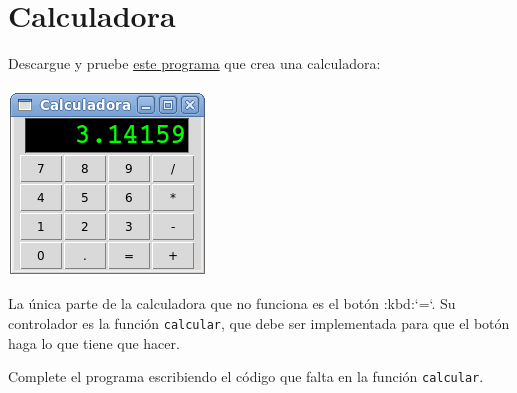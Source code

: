 \section{Calculadora}

Descargue y pruebe
\href{../../\_static/programas/tkinter/calculadora.py}{este programa}
que crea una calculadora:

\includegraphics{../../_static/capturas/calc.png}

La única parte de la calculadora que no funciona es el botón :kbd:`=`.
Su controlador es la función \lstinline!calcular!, que debe ser
implementada para que el botón haga lo que tiene que hacer.

Complete el programa escribiendo el código que falta en la función
\lstinline!calcular!.
